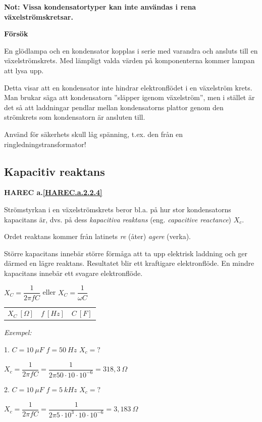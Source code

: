 \textbf{Not: Vissa kondensatortyper kan inte användas i rena
  växelströmskretsar.}

\textbf{Försök}

En glödlampa och en kondensator kopplas i serie med varandra och ansluts till en
växelströmskrets. Med lämpligt valda värden på komponenterna kommer lampan att
lysa upp.

Detta visar att en kondensator inte hindrar elektronflödet i en växelström
krets. Man brukar säga att kondensatorn ''släpper igenom växelström'', men i
stället är det så att laddningar pendlar mellan kondensatorns plattor genom den
strömkrets som kondensatorn är ansluten till.

Använd för säkerhets skull låg spänning, t.ex. den från en
ringledningstransformator!

\subsection{Kapacitiv reaktans}
\textbf{HAREC a.\ref{HAREC.a.2.2.4}\label{myHAREC.a.2.2.4}}

Strömstyrkan i en växelströmskrets beror bl.a. på hur stor kondensatorns
kapacitans är, dvs. på dess \emph{kapacitiva reaktans} (eng.
\emph{capacitive reactance}) \(X_c\).

Ordet reaktans kommer från latinets \emph{re} (åter) \emph{agere} (verka).

Större kapacitans innebär större förmåga att ta upp elektrisk laddning och ger
därmed en lägre reaktans. Resultatet blir ett kraftigare elektronflöde.
En mindre kapacitans innebär ett svagare elektronflöde.

\(X_C = \dfrac{1}{2\pi fC}\) eller \(X_C = \dfrac{1}{\omega C}\)

\begin{tabular}{lll}
\(X_C\ [\Omega]\) & \(f\ [Hz]\) & \(C\ [F]\) 
\end{tabular}

\emph{Exempel:}

1. \(C = 10\ \mu F\) \(f = 50\ Hz\) \(X_c = ?\)

\(X_c = \dfrac{1}{2\pi fC} = \dfrac{1}{2\pi 50 \cdot 10 \cdot 10^{-6}} = 318,3\ \Omega\)

2. \(C = 10\ \mu F\) \(f = 5\ kHz\) \(X_c = ?\)

\(X_c = \dfrac{1}{2\pi fC} = \dfrac{1}{2\pi 5 \cdot 10^3 \cdot 10 \cdot 10^{-6}}
= 3,183\ \Omega\)

